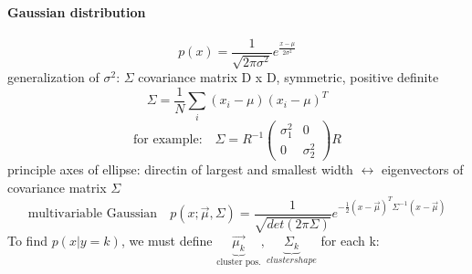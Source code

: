 \documentclass[11pt]{article}
\begin{document}
        \paragraph{Gaussian distribution}
          \begin{equation*}
            p(x) = \frac{1}{\sqrt{2\pi\sigma^2}}e^{\frac{x-\mu}{2\sigma^2}}
          \end{equation*}
          generalization of $\sigma^2$: $\Sigma$ covariance matrix D x D,
          symmetric, positive definite
          \begin{equation*}
            \Sigma = \frac{1}{N}\sum_i(x_i-\mu)(x_i-\mu)^T
          \end{equation*}
          \begin{equation*} \text{for example:} \quad
            \Sigma = R^{-1}\begin{pmatrix}
            \sigma_1^2 & 0 \\
            0 & \sigma_2^2
            \end{pmatrix} R
          \end{equation*}
          principle axes of ellipse: directin of largest and smallest width
          $\leftrightarrow$ eigenvectors of covariance matrix $\Sigma$
          \begin{equation*}
            \text{multivariable Gaussian} \quad p(x;\vec{\mu},\Sigma) =
            \frac{1}{\sqrt{det(2\pi\Sigma)}}e^{-\frac{1}{2}(x-\vec{\mu})^T
            \Sigma^{-1}(x-\vec{\mu})}
          \end{equation*}
          To find $p(x|y=k)$, we must define $\underbrace{\vec{\mu_{k}}}_{\text
          {cluster pos.}}, \underbrace{\Sigma_{k}}_{cluster shape}$ for
          each k:
\end{document}
